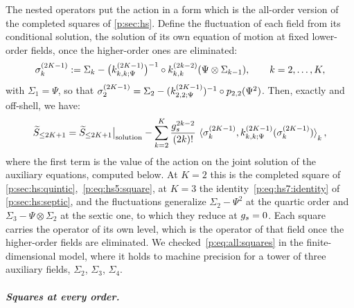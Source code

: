 The nested operators put the action in a form which is the all-order version of the completed squares of \cref{p:sec:hs}.
Define the fluctuation of each field from its conditional solution, the solution of its own equation of motion at fixed lower-order fields, once the higher-order ones are eliminated:
\begin{equation}
  \label{p:eq:all:deviation}
  \sigma_k^{(2 K - 1)}
    := \Sigma_k - \big( \kin{k}{\Psi}{2 K - 1} \big)^{-1} \circ \kin{k}{}{2 k - 2}(\Psi \otimes \Sigma_{k - 1}),
  \qquad
  k = 2, \ldots, K,
\end{equation}
with $\Sigma_1 = \Psi$, so that $\sigma_2^{(2 K - 1)} = \Sigma_2 - (\kin{2}{\Psi}{2 K - 1})^{-1} \circ \sprod{2}{2}(\Psi^2)$.
Then, exactly and off-shell, we have:
\begin{equation}
  \label{p:eq:all:squares}
  \caction[\le 2 K + 1]
    = \caction[\le 2 K + 1] \big|_{\text{solution}}
      - \sum_{k = 2}^{K} \frac{\gs^{2 k - 2}}{(2 k)!} \, \pair[k]{\sigma_k^{(2 K - 1)}}{\kin{k}{\Psi}{2 K - 1}(\sigma_k^{(2 K - 1)})},
\end{equation}
where the first term is the value of the action on the joint solution of the auxiliary equations, computed below.
At $K = 2$ this is the completed square of \cref{p:sec:hs:quintic},~\eqref{p:eq:hs5:square}, at $K = 3$ the identity~\eqref{p:eq:hs7:identity} of \cref{p:sec:hs:septic}, and the fluctuations generalize $\Sigma_2 - \Psi^2$ at the quartic order and $\Sigma_3 - \Psi \otimes \Sigma_2$ at the sextic one, to which they reduce at $g_s = 0$.
Each square carries the operator of its own level, which is the operator of that field once the higher-order fields are eliminated.
We checked~\eqref{p:eq:all:squares} in the finite-dimensional model, where it holds to machine precision for a tower of three auxiliary fields, $\Sigma_2$, $\Sigma_3$, $\Sigma_4$.

\subparagraph{Squares at every order.}

